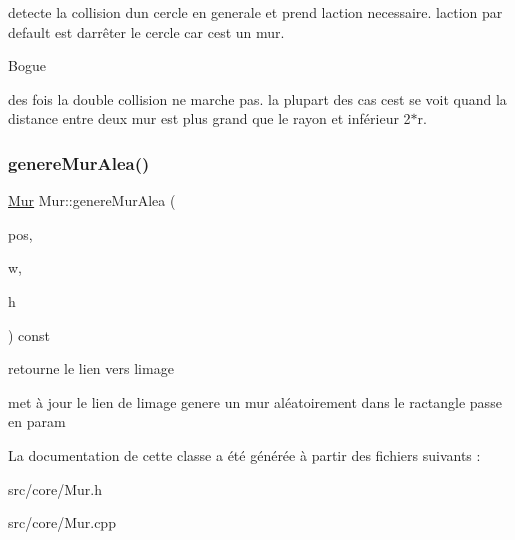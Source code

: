 detecte la collision d\textquotesingle{}un cercle en generale et prend l\textquotesingle{}action necessaire. l\textquotesingle{}action par default est d\textquotesingle{}arrêter le cercle car c\textquotesingle{}est un mur. 

\begin{DoxyRefDesc}{Bogue}
\item[\mbox{\hyperlink{bug__bug000001}{Bogue}}]des fois la double collision ne marche pas. la plupart des cas c\textquotesingle{}est se voit quand la distance entre deux mur est plus grand que le rayon et inférieur 2$\ast$r.\end{DoxyRefDesc}
\mbox{\label{class_mur_aeb65d73f7f7176a5e77e220107a4902f}} 
\subsubsection{\texorpdfstring{genere\+Mur\+Alea()}{genereMurAlea()}}
{\footnotesize\ttfamily \mbox{\hyperlink{class_mur}{Mur}} Mur\+::genere\+Mur\+Alea (\begin{DoxyParamCaption}\item[{const Vec2 \&}]{pos,  }\item[{unsigned int}]{w,  }\item[{unsigned int}]{h }\end{DoxyParamCaption}) const}



retourne le lien vers l\textquotesingle{}image 

met à jour le lien de l\textquotesingle{}image genere un mur aléatoirement dans le ractangle passe en param 

La documentation de cette classe a été générée à partir des fichiers suivants \+:\begin{DoxyCompactItemize}
\item 
src/core/Mur.\+h\item 
src/core/Mur.\+cpp\end{DoxyCompactItemize}
